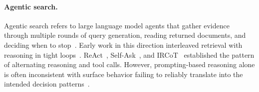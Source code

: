 \documentclass{article}
\newcommand{\sys}{\texttt{Harness-1}\xspace}
\newcommand{\verify}{\texttt{verify}\xspace}
\newcommand{\curate}{\texttt{curate}\xspace}
\begin{document}


\paragraph{Agentic search.}
Agentic search refers to large language  model agents that gather evidence through multiple rounds of query generation, reading returned documents, and deciding when to stop~\citep{zhang2025web}. 
Early work in this direction interleaved retrieval with reasoning in tight loops~\citep{li2025search, gao2025beyond, liu2025webexplorer, cognition2025swegrep}. ReAct~\citep{yao2023react}, Self-Ask~\citep{press2023measuring}, and IRCoT~\citep{trivedi2023interleaving} established the pattern of alternating reasoning and tool calls. However, prompting-based reasoning alone is often inconsistent with surface behavior failing to reliably translate into the intended decision patterns~\citep{turpin2023language,lanham2023measuring, han2025personalityillusionrevealingdissociation, han2026steer2adapt}.
\end{document}
